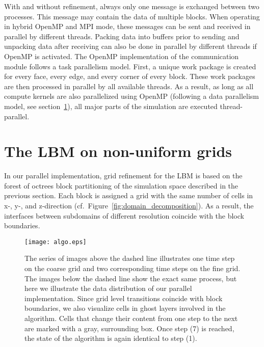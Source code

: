 \documentclass[final,leqno,onefignum,onetabnum]{siamltex1213}
\begin{document}
With and without refinement, always only one message is exchanged between two processes.
This message may contain the data of multiple blocks.
When operating in hybrid OpenMP and MPI mode, these messages can be sent and received in parallel by different threads.
Packing data into buffers prior to sending and unpacking data after receiving can also be done in parallel by different threads if OpenMP is activated.
The OpenMP implementation of the communication module follows a task parallelism model.
First, a unique work package is created for every face, every edge, and every corner of every block.
These work packages are then processed in parallel by all available threads.
As a result, as long as all compute kernels are also parallelized using OpenMP (following a data parallelism model, see section~\ref{sec:lbmref}), all major parts of the simulation are executed thread-parallel.

\section{The LBM on non-uniform grids}\label{sec:lbmref}

In our parallel implementation,
grid refinement for the LBM is based on the forest of octrees block partitioning of the simulation space described in the previous section.
Each block is assigned a grid with the same number of cells in x-, y-, and z-direction (cf.\ Figure~\ref{fig:domain_decomposition}).
As a result, the interfaces between subdomains of different resolution coincide with the block boundaries.

\begin{figure}[tbp]
  \centering
  \texttt{[image: algo.eps]}
  \caption{The series of images above the dashed line illustrates one time step on the coarse grid and two corresponding time steps on the fine grid.
The images below the dashed line show the exact same process, but here we illustrate the data distribution of our parallel implementation.
Since grid level transitions coincide with block boundaries, we also visualize cells in ghost layers involved in the algorithm.
Cells that change their content from one step to the next are marked with a gray, surrounding box. Once step (7) is reached, the state of the algorithm is again identical to step (1).}
  \label{fig:algorithm}
\end{figure}
\end{document}
